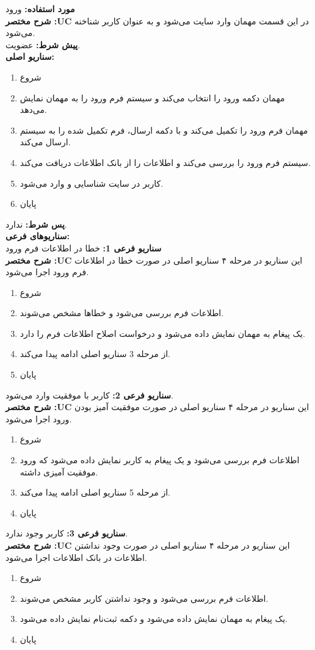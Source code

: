 \textbf{مورد استفاده:}
ورود
\\
\textbf{شرح مختصر :UC}
در این قسمت مهمان وارد سایت می‌شود و به عنوان کاربر شناخنه می‌شود.
\\
\textbf{پيش شرط:}
عضویت.
\\
\textbf{سناريو اصلی:}
\begin{enumerate}
\item
شروع
\item
مهمان دکمه ورود را انتخاب می‌کند و سیستم فرم ورود را به مهمان نمایش می‌دهد.
\item
مهمان فرم ورود را تکمیل می‌کند و با دکمه ارسال، فرم تکمیل شده را به سیستم ارسال می‌کند.
\item
سیستم فرم ورود را بررسی می‌کند و اطلاعات را از بانک اطلاعات دریافت می‌کند.
\item
کاربر در سایت شناسایی و وارد می‌شود.
\item
پایان
\end{enumerate}

\noindent
\textbf{پس شرط:}
ندارد.
\\
\textbf{سناريوهای فرعی:}
\\
\textbf{سناريو فرعی 1:}
خطا در اطلاعات فرم ورود
\\
\textbf{شرح مختصر :UC}
این سناریو در مرحله ۴ سناریو اصلی در صورت خطا در اطلاعات فرم ورود اجرا می‌شود.
\begin{enumerate}
\item
شروع
\item
اطلاعات فرم بررسی می‌شود و خطاها مشخص می‌شوند.
\item
یک پیغام به مهمان نمایش داده می‌شود و درخواست اصلاح اطلاعات فرم را دارد.
\item
از مرحله 3 سناریو اصلی ادامه پیدا می‌کند.
\item
پایان
\end{enumerate}

\noindent
\textbf{سناريو فرعی 2:}
کاربر با موفقیت وارد می‌شود.
\\
\textbf{شرح مختصر :UC}
این سناریو در مرحله ۴ سناریو اصلی در صورت موفقیت آمیز بودن ورود اجرا می‌شود.
\begin{enumerate}
\item
شروع
\item
اطلاعات فرم بررسی می‌شود و یک پیغام به کاربر نمایش داده می‌شود که ورود موفقیت آمیزی داشته.
\item
از مرحله 5 سناریو اصلی ادامه پیدا می‌کند.
\item
پایان
\end{enumerate}

\noindent
\textbf{سناريو فرعی 3:}
کاربر وجود ندارد.
\\
\textbf{شرح مختصر :UC}
این سناریو در مرحله ۴ سناریو اصلی در صورت وجود نداشتن اطلاعات در بانک اطلاعات اجرا می‌شود.
\begin{enumerate}
	\item
	شروع
	\item
	اطلاعات فرم بررسی می‌شود و وجود نداشتن کاربر مشخص می‌شوند.
	\item
	یک پیغام به مهمان نمایش داده می‌شود و دکمه ثبت‌نام نمایش داده می‌شود.
	\item
	پایان
\end{enumerate}

